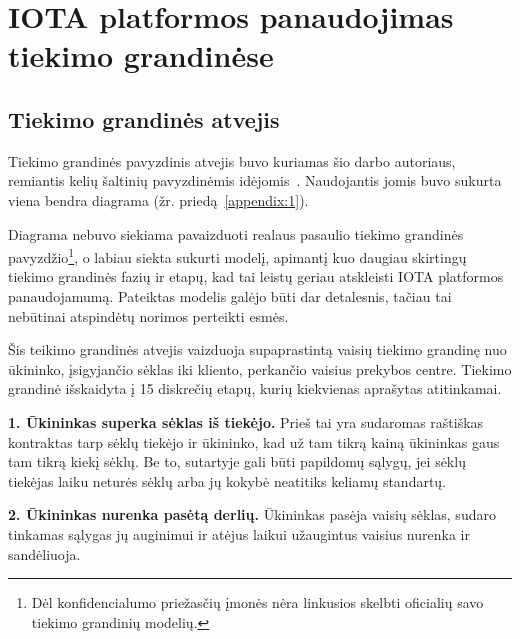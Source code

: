 
\section{IOTA platformos panaudojimas tiekimo grandinėse} \label{section:application}




\subsection{Tiekimo grandinės atvejis} \label{subsection:sc-example}

Tiekimo grandinės pavyzdinis atvejis buvo kuriamas šio darbo autoriaus, remiantis kelių šaltinių pavyzdinėmis idėjomis~\cite{christopher2016logistics, webber2009building, patrick2017continuous, justin2016customer}. Naudojantis jomis buvo sukurta viena bendra diagrama (žr. priedą~\ref{appendix:1}). 

Diagrama nebuvo siekiama pavaizduoti realaus pasaulio tiekimo grandinės pavyzdžio\footnote{Dėl konfidencialumo priežasčių įmonės nėra linkusios skelbti oficialių savo tiekimo grandinių modelių.}, o labiau siekta sukurti modelį, apimantį kuo daugiau skirtingų tiekimo grandinės fazių ir etapų, kad tai leistų geriau atskleisti IOTA platformos panaudojamumą. Pateiktas modelis galėjo būti dar detalesnis, tačiau tai nebūtinai atspindėtų norimos perteikti esmės.

Šis teikimo grandinės atvejis vaizduoja supaprastintą vaisių tiekimo grandinę nuo ūkininko, įsigyjančio sėklas iki kliento, perkančio vaisius prekybos centre. Tiekimo grandinė išskaidyta į 15 diskrečių etapų, kurių kiekvienas aprašytas atitinkamai.

\medskip \noindent \textbf{1. Ūkininkas superka sėklas iš tiekėjo.} Prieš tai yra sudaromas raštiškas kontraktas tarp sėklų tiekėjo ir ūkininko, kad už tam tikrą kainą ūkininkas gaus tam tikrą kiekį sėklų. Be to, sutartyje gali būti papildomų sąlygų, jei sėklų tiekėjas laiku neturės sėklų arba jų kokybė neatitiks keliamų standartų.

\medskip \noindent \textbf{2. Ūkininkas nurenka pasėtą derlių.} Ūkininkas pasėja vaisių sėklas, sudaro tinkamas sąlygas jų auginimui ir atėjus laikui užaugintus vaisius nurenka ir sandėliuoja. 


